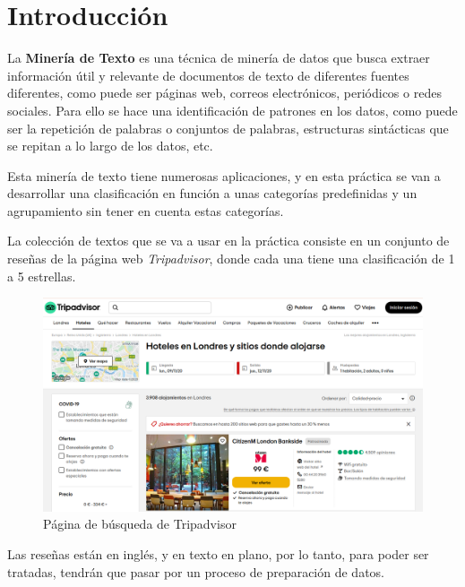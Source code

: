 \documentclass[12pt,a4paper, xcolor=table]{article}
\begin{document}
\section{Introducción}

    La \textbf{Minería de Texto} es una técnica de minería de datos que busca extraer información útil y relevante de documentos de texto de diferentes fuentes diferentes, como puede ser páginas web, correos electrónicos, periódicos o redes sociales. Para ello se hace una identificación de patrones en los datos, como puede ser la repetición de palabras o conjuntos de palabras, estructuras sintácticas que se repitan a lo largo de los datos, etc.

    \vspace{3mm}

    Esta minería de texto tiene numerosas aplicaciones, y en esta práctica se van a desarrollar una clasificación en función a unas categorías predefinidas y un agrupamiento sin tener en cuenta estas categorías.

    \vspace{2mm}

    La colección de textos que se va a usar en la práctica consiste en un conjunto de reseñas de la página web \textit{Tripadvisor}, donde cada una tiene una clasificación de 1 a 5 estrellas.

    \begin{figure}[!h]
      \centering
      \includegraphics[width=14cm]{img/tripadvisor-main.png}
      \caption{Página de búsqueda de Tripadvisor}
    \end{figure}

    Las reseñas están en inglés, y en texto en plano, por lo tanto, para poder ser tratadas, tendrán que pasar por un proceso de preparación de datos.
\end{document}
